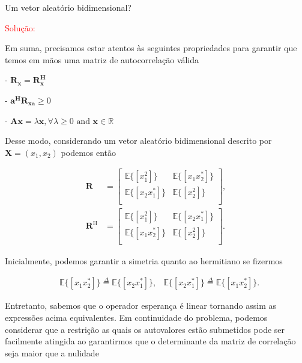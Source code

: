     
     Um vetor aleatório bidimensional?
    
        \textcolor{red}{Solução:}
        
        Em suma, precisamos estar atentos às seguintes propriedades para garantir que temos em mãos uma matriz de autocorrelação válida
        
        
        - $\mathbf{R_{x}} = \mathbf{R^{H}_{x}}$
        
        - $\mathbf{a^{H}} \mathbf{R_{xa}} \geq 0$
        
        - $\mathbf{Ax} = \lambda \mathbf{x}, \forall \lambda \geq 0 \text{ and } \mathbf{x} \in \mathbb{R}$
        
        Desse modo, considerando um vetor aleatório bidimensional descrito por $\mathbf{X} = (x_{1},x_{2})$ podemos então
        
        \begin{align}
            \mathbf{R} &= \left[ 
            \begin{matrix}
                \mathbb{E}\{[x^{2}_{1}]\} & \mathbb{E}\{[x_{1}x^{*}_{2}]\} \\
                \mathbb{E}\{[x_{2}x^{*}_{1}]\} & \mathbb{E}\{[x^{2}_{2}]\} \\
            \end{matrix} \right], \\
            \mathbf{R}^{\text{H}} &= \left[ 
            \begin{matrix}
                \mathbb{E}\{[x^{2}_{1}]\} & \mathbb{E}\{[x_{2}x^{*}_{1}]\} \\
                \mathbb{E}\{[x_{1}x^{*}_{2}]\} & \mathbb{E}\{[x^{2}_{2}]\} \\
            \end{matrix} \right].
        \end{align}
        
        Inicialmente, podemos garantir a simetria quanto ao hermitiano se fizermos 
        
        \begin{align}
            &\mathbb{E}\{[x_{1}x^{*}_{2}]\} \overset{\Delta}{=} \mathbb{E}\{[x_{2}x^{*}_{1}]\},
            &\mathbb{E}\{[x_{2}x^{*}_{1}]\} \overset{\Delta}{=} \mathbb{E}\{[x_{1}x^{*}_{2}]\}.
        \end{align}
        
        Entretanto, sabemos que o operador esperança é linear tornando assim as expressões acima equivalentes. Em continuidade do problema, podemos 
        considerar que a restrição as quais os autovalores estão submetidos pode ser facilmente atingida ao garantirmos que o determinante da matriz 
        de correlação seja maior que a nulidade
        
